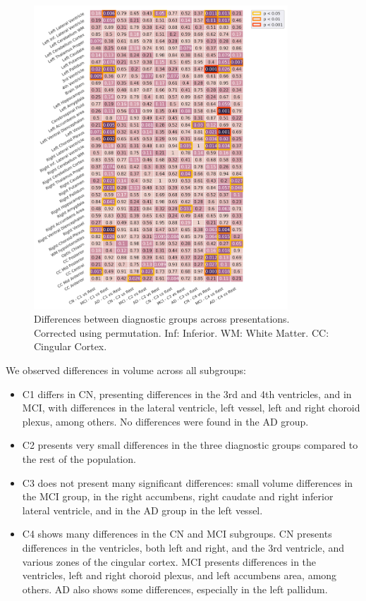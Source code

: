 \begin{figure}[!htbp]
\centering
\includegraphics[width=0.85\textwidth]{figures/cimlr/groupsdxcluster_againstrest.png}
\caption[Diagnostic interaction analysis.]{Differences between diagnostic groups across presentations. Corrected using permutation. Inf: Inferior. WM: White Matter. CC: Cingular Cortex.}
\label{dxcluster_againstrest}
\end{figure}

We observed differences in volume across all subgroups:

\begin{itemize}
    \item C1 differs in CN, presenting differences in the 3rd and 4th ventricles, and in MCI, with differences in the lateral ventricle, left vessel, left and right choroid plexus, among others. No differences were found in the AD group.
    \item C2 presents very small differences in the three diagnostic groups compared to the rest of the population.
    \item C3 does not present many significant differences: small volume differences in the MCI group, in the right accumbens, right caudate and right inferior lateral ventricle, and in the AD group in the left vessel. 
    \item C4 shows many differences in the CN and MCI subgroups. CN presents differences in the ventricles, both left and right, and the 3rd ventricle, and various zones of the cingular cortex. MCI presents differences in the ventricles, left and right choroid plexus, and left accumbens area, among others. AD also shows some differences, especially in the left pallidum.
\end{itemize}

